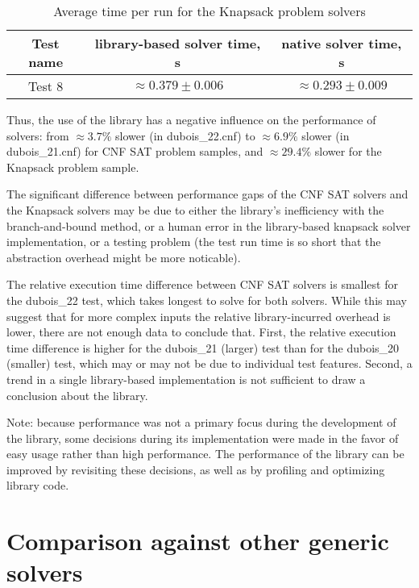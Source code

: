 \begin{table}[h]
 \centering
 \caption{Average time per run for the Knapsack problem solvers}
 \label{tab:perf_knapsack}

 \begin{tabular}{|ccc|}
  \hline
  Test name & library-based solver time, s & native solver time, s \\
  \hline
  Test 8 & $\approx 0.379\pm 0.006$ & $\approx 0.293\pm 0.009$ \\
  \hline
 \end{tabular}
\end{table}

Thus, the use of the library has a negative influence on the performance of solvers:
from $\approx 3.7\%$ slower (in dubois\_22.cnf) to $\approx 6.9\%$ slower (in dubois\_21.cnf)
for CNF SAT problem samples, and $\approx 29.4\%$ slower for the Knapsack problem sample.

The significant difference between performance gaps of the CNF SAT solvers and the Knapsack solvers
may be due to either the library's inefficiency with the branch-and-bound method, or a human
error in the library-based knapsack solver implementation, or a testing problem
(the test run time is so short that the abstraction overhead might be more noticable).

The relative execution time difference between CNF SAT solvers is smallest for the
dubois\_22 test, which takes longest to solve for both solvers. While this may
suggest that for more complex inputs the relative library-incurred overhead is lower,
there are not enough data to conclude that. First, the relative execution
time difference is higher for the dubois\_21 (larger) test than for the dubois\_20 (smaller)
test, which may or may not be due to individual test features. Second, a trend in a single
library-based implementation is not sufficient to draw a conclusion about the library.

Note: because performance was not a primary focus during the development of the library,
some decisions during its implementation were made in the favor of easy usage rather than
high performance. The performance of the library can be improved by revisiting these
decisions, as well as by profiling and optimizing library code.

\section{Comparison against other generic solvers}

